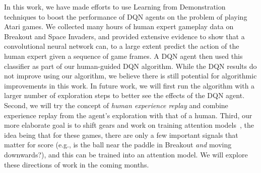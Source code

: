 \documentclass[letterpaper, 10pt, conference]{ieeeconf}
\begin{document}
In this work, we have made efforts to use Learning from Demonstration techniques
to boost the performance of DQN agents on the problem of playing Atari games. We
collected many hours of human expert gameplay data on Breakout and Space
Invaders, and provided extensive evidence to show that a convolutional
neural network can, to a large extent predict the action of the human expert
given a sequence of game frames. A DQN agent then used this classifier as part
of our human-guided DQN algorithm. While the DQN results do not improve using
our algorithm, we believe there is still potential for algorithmic improvements
in this work. In future work, we will first run the algorithm with a larger
number of exploration steps to better see the effects of the DQN agent.  Second,
we will try the concept of \emph{human experience replay} and combine experience
replay from the agent's exploration with that of a human. Third, our more
elaborate goal is to shift gears and work on training attention
models~\cite{NIPS2014_5542,icml2015_xuc15}, the idea being that for these games,
there are only a few important signals that matter for score (e.g., is the ball
near the paddle in Breakout \emph{and} moving downwards?), and this can be
trained into an attention model. We will explore these directions of work in the
coming months.



\end{document}
